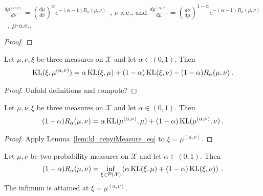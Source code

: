 \begin{lemma}
  \label{lem:rnDeriv_renyiMeasure}
  $\frac{d \mu^{(\alpha, \nu)}}{d \nu} = \left(\frac{d\mu}{d\nu}\right)^\alpha e^{-(\alpha - 1) R_\alpha(\mu, \nu)}$~, $\nu$-a.e.,
  and
  $\frac{d \mu^{(\alpha, \nu)}}{d \mu} = \left(\frac{d\nu}{d\mu}\right)^{1 - \alpha} e^{-(\alpha - 1) R_\alpha(\mu, \nu)}$~, $\mu$-a.e..
\end{lemma}

\begin{proof}%
{}

\end{proof}


\begin{lemma}
  \label{lem:kl_renyiMeasure_eq}
  Let $\mu, \nu, \xi$ be three measures on $\mathcal X$ and let $\alpha \in (0, 1)$. Then
  \begin{align*}
  \operatorname{KL}(\xi, \mu^{(\alpha, \nu)}) = \alpha \operatorname{KL}(\xi, \mu) + (1 - \alpha)\operatorname{KL}(\xi, \nu) - (1 - \alpha) R_\alpha(\mu, \nu) \: .
  \end{align*}
\end{lemma}

\begin{proof}
Unfold definitions and compute?
\end{proof}


\begin{corollary}
  \label{cor:renyi_eq_add_kl}
  Let $\mu, \nu, \xi$ be three measures on $\mathcal X$ and let $\alpha \in (0, 1)$. Then
  \begin{align*}
  (1 - \alpha) R_\alpha(\mu, \nu) = \alpha \operatorname{KL}(\mu^{(\alpha, \nu)}, \mu) + (1 - \alpha)\operatorname{KL}(\mu^{(\alpha, \nu)}, \nu) \: .
  \end{align*}
\end{corollary}

\begin{proof}
Apply Lemma~\ref{lem:kl_renyiMeasure_eq} to $\xi = \mu^{(\alpha, \nu)}$.
\end{proof}


\begin{lemma}
  \label{lem:renyi_eq_inf_add_kl}
  Let $\mu, \nu$ be two probability measures on $\mathcal X$ and let $\alpha \in (0, 1)$. Then
  \begin{align*}
  (1 - \alpha) R_\alpha(\mu, \nu) = \inf_{\xi \in \mathcal P(\mathcal X)}\left( \alpha \operatorname{KL}(\xi, \mu) + (1 - \alpha)\operatorname{KL}(\xi, \nu) \right) \: .
  \end{align*}
  The infimum is attained at $\xi = \mu^{(\alpha, \nu)}$.
\end{lemma}

